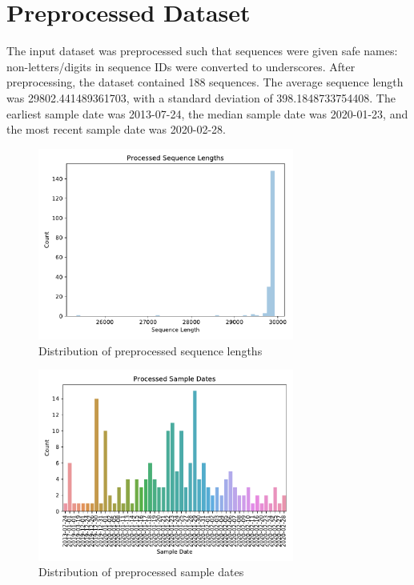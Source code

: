 \documentclass{article}
\begin{document}
\section{Preprocessed Dataset}
The input dataset was preprocessed such that sequences were given safe names: non-letters/digits in sequence IDs were converted to underscores.
After preprocessing, the dataset contained 188 sequences.
The average sequence length was 29802.441489361703,
with a standard deviation of 398.1848733754408.
The earliest sample date was 2013-07-24,
the median sample date was 2020-01-23,
and the most recent sample date was 2020-02-28.


\begin{figure}[h]
\centering
\includegraphics[width=0.75\textwidth]{./figs/processed_sequence_lengths.pdf}
\caption{Distribution of preprocessed sequence lengths}
\end{figure}



\begin{figure}[h]
\centering
\includegraphics[width=0.75\textwidth]{./figs/processed_sample_dates.pdf}
\caption{Distribution of preprocessed sample dates}
\end{figure}
\end{document}
